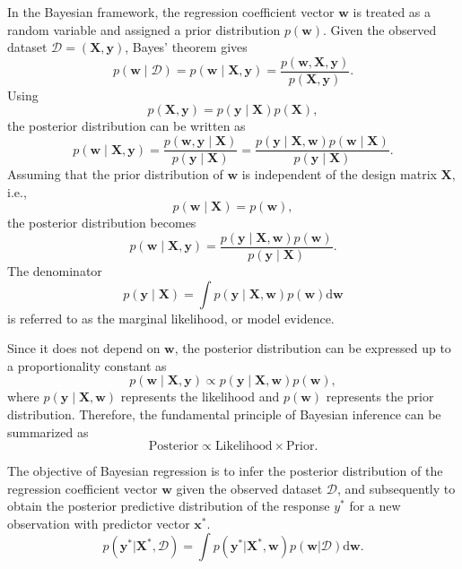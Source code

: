 \documentclass[../../Bayesian_Inference.tex]{subfiles}
\begin{document}
In the Bayesian framework, the regression coefficient vector $\bm{w}$ is treated as a random variable and assigned a prior distribution $p(\bm{w})$. Given the observed dataset $\mathcal{D} = (\mathbf{X},\bm{y})$, Bayes' theorem gives
\[
    p(\bm{w} \mid \mathcal{D})
    =
    p(\bm{w} \mid \mathbf{X}, \bm{y})
    =
    \frac{p(\bm{w},\mathbf{X},\bm{y})}
         {p(\mathbf{X},\bm{y})}.
\]
Using
\[
    p(\mathbf{X},\bm{y})
    =
    p(\bm{y}\mid\mathbf{X})p(\mathbf{X}),
\]
the posterior distribution can be written as
\[
    p(\bm{w} \mid \mathbf{X}, \bm{y})
    =
    \frac{p(\bm{w},\bm{y}\mid\mathbf{X})}
         {p(\bm{y}\mid\mathbf{X})}
    =
    \frac{
        p(\bm{y}\mid\mathbf{X},\bm{w})
        p(\bm{w}\mid\mathbf{X})
    }{
        p(\bm{y}\mid\mathbf{X})
    }.
\]
Assuming that the prior distribution of $\bm{w}$ is independent of the design matrix $\mathbf{X}$, i.e.,
\[
    p(\bm{w}\mid\mathbf{X}) = p(\bm{w}),
\]
the posterior distribution becomes
\begin{equation}
    \boxed{p(\bm{w} \mid \mathbf{X}, \bm{y})
    =
    \frac{
        p(\bm{y} \mid \mathbf{X}, \bm{w})
        p(\bm{w})
    }{
        p(\bm{y}\mid\mathbf{X})
    }}.    
\end{equation} 
The denominator
\begin{equation}
    \boxed{p(\bm{y}\mid\mathbf{X})
    =
    \int
    p(\bm{y}\mid\mathbf{X},\bm{w})
    p(\bm{w})
    \mathrm{d}\bm{w}}    
\end{equation} 
is referred to as the marginal likelihood, or model evidence. 

Since it does not depend on $\bm{w}$, the posterior distribution can be expressed up to a proportionality constant as
\begin{equation}
    \boxed{p(\bm{w} \mid \mathbf{X}, \bm{y})
    \propto
    p(\bm{y} \mid \mathbf{X}, \bm{w})
    p(\bm{w})},   
\end{equation}
where $p(\bm{y} \mid \mathbf{X}, \bm{w})$ represents the likelihood and $p(\bm{w})$ represents the prior distribution. Therefore, the fundamental principle of Bayesian inference can be summarized as
\[
    \boxed{\text{Posterior}
    \propto
    \text{Likelihood}
    \times
    \text{Prior}}.
\]

The objective of Bayesian regression is to infer the posterior distribution of the regression coefficient vector $\bm{w}$ given the observed dataset $\mathcal{D}$, and subsequently to obtain the posterior predictive distribution of the response $y^{*}$ for a new observation with predictor vector $\bm{x}^{*}$.
\[
    p(\bm{y}^* | \mathbf{X}^{*}, \mathcal{D}) = \int p(\bm{y}^* | \mathbf{X}^{*}, \bm{w}) p(\bm{w} | \mathcal{D}) \mathrm{d} \bm{w}.
\]
\end{document}
